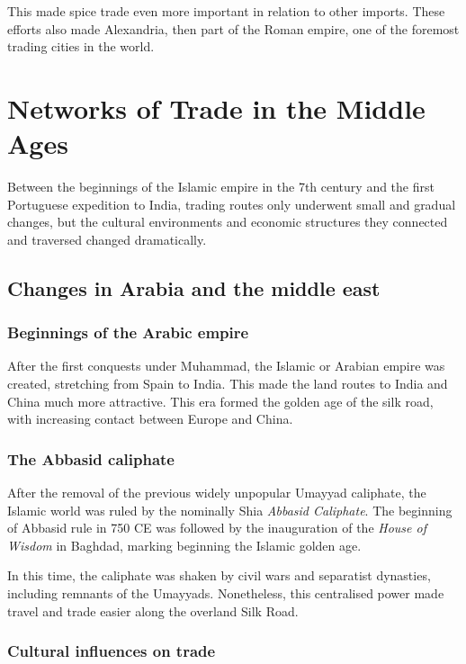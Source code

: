 \documentclass[11pt, a4paper, headings=standardclasses]{scrartcl}
\begin{document}
This made spice trade even more important in relation to other imports.\autocite{SilkRome, Rome} These efforts also made Alexandria, then part of the Roman empire, one of the foremost trading cities in the world.\autocite{SpiceTrade}
\section{Networks of Trade in the Middle Ages}

Between the beginnings of the Islamic empire in the 7th century and the first Portuguese expedition to India, trading routes only underwent small and gradual changes, but the cultural environments and economic structures they connected and traversed changed dramatically.

\subsection{Changes in Arabia and the middle east}

\subsubsection{Beginnings of the Arabic empire}
After the first conquests under Muhammad, the Islamic or Arabian empire was created, stretching from Spain to India\autocite[Section \textit{Achievements}]{Umayyad}. This made the land routes to India and China much more attractive. This era formed the golden age of the silk road, with increasing contact between Europe and China.

\subsubsection{The Abbasid caliphate}

After the removal of the previous widely unpopular\autocite{Umayyad} Umayyad caliphate, the Islamic world was ruled by the nominally Shia \emph{Abbasid Caliphate}. The beginning of Abbasid rule in 750 CE was followed by the inauguration of the \emph{House of Wisdom} in Baghdad, marking beginning the Islamic golden age.\autocite{Abbasid}

In this time, the caliphate was shaken by civil wars and separatist dynasties, including remnants of the Umayyads.\autocite[Section \textit{End}]{Umayyad} Nonetheless, this centralised power made travel and trade easier along the overland Silk Road.

\subsubsection{Cultural influences on trade}
\end{document}

